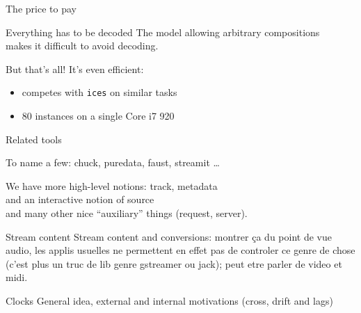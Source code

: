 \documentclass{beamer}
\renewcommand{\emph}[1]{\alert{#1}}
\begin{document}
\begin{frame}{The price to pay}

\begin{block}{Everything has to be decoded}
The model allowing arbitrary compositions \\
makes it difficult to avoid decoding.
\end{block}

\vfill\pause

\begin{block}{But that's all!}
It's even efficient:
\begin{itemize}
\item competes with \texttt{ices} on similar tasks
\item 80 instances on a single Core i7 920
\end{itemize}
\end{block}

\end{frame}

\begin{frame}{Related tools}

To name a few: chuck, puredata, faust, streamit \ldots

\vfill

We have more high-level notions: track, metadata \\
and an \emph{interactive} notion of source \\
and many other nice ``auxiliary'' things (request, server).

\end{frame}


\begin{frame}{Stream content}
Stream content and conversions: montrer ça du point de vue audio, les applis usuelles ne permettent en effet pas de controler ce genre de chose (c'est plus un truc de lib genre gstreamer ou jack); peut etre parler de video et midi.
\end{frame}


\begin{frame}{Clocks}
General idea, external and internal motivations (cross, drift and lags)
\end{frame}

\end{document}
